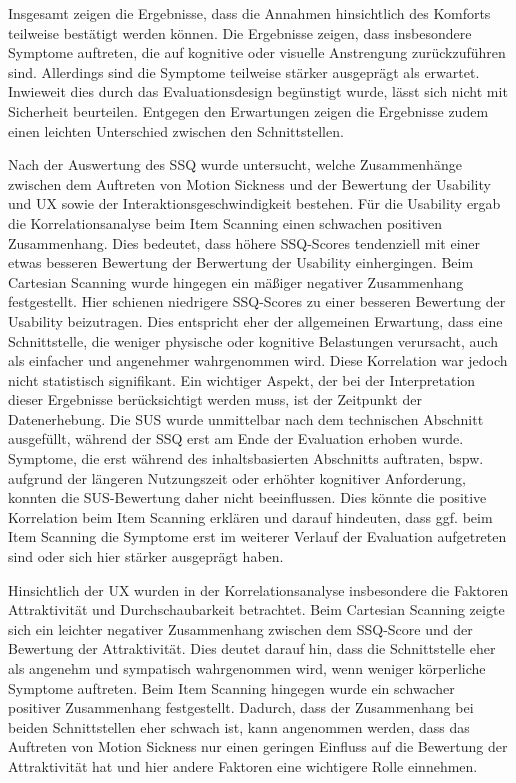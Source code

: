 Insgesamt zeigen die Ergebnisse, dass die Annahmen hinsichtlich des Komforts teilweise bestätigt werden können. Die Ergebnisse zeigen, dass insbesondere Symptome auftreten, die auf kognitive oder visuelle Anstrengung zurückzuführen sind. Allerdings sind die Symptome teilweise stärker ausgeprägt als erwartet. Inwieweit dies durch das Evaluationsdesign begünstigt wurde, lässt sich nicht mit Sicherheit beurteilen. Entgegen den Erwartungen zeigen die Ergebnisse zudem einen leichten Unterschied zwischen den Schnittstellen. 

Nach der Auswertung des SSQ wurde untersucht, welche Zusammenhänge zwischen dem Auftreten von Motion Sickness und der Bewertung der Usability und UX sowie der Interaktionsgeschwindigkeit bestehen.
Für die Usability ergab die Korrelationsanalyse beim Item Scanning einen schwachen positiven Zusammenhang. Dies bedeutet, dass höhere SSQ-Scores tendenziell mit einer etwas besseren Bewertung der Berwertung der Usability einhergingen. Beim Cartesian Scanning wurde hingegen ein mäßiger negativer Zusammenhang festgestellt. Hier schienen niedrigere SSQ-Scores zu einer besseren Bewertung der Usability beizutragen. Dies entspricht eher der allgemeinen Erwartung, dass eine Schnittstelle, die weniger physische oder kognitive Belastungen verursacht, auch als einfacher und angenehmer wahrgenommen wird. Diese Korrelation war jedoch nicht statistisch signifikant. Ein wichtiger Aspekt, der bei der Interpretation dieser Ergebnisse berücksichtigt werden muss, ist der Zeitpunkt der Datenerhebung. Die SUS wurde unmittelbar nach dem technischen Abschnitt ausgefüllt, während der SSQ erst am Ende der Evaluation erhoben wurde. Symptome, die erst während des inhaltsbasierten Abschnitts auftraten, bspw. aufgrund der längeren Nutzungszeit oder erhöhter kognitiver Anforderung, konnten die SUS-Bewertung daher nicht beeinflussen. Dies könnte die positive Korrelation beim Item Scanning erklären und darauf hindeuten, dass ggf. beim Item Scanning die Symptome erst im weiterer Verlauf der Evaluation aufgetreten sind oder sich hier stärker ausgeprägt haben.

Hinsichtlich der UX wurden in der Korrelationsanalyse insbesondere die Faktoren Attraktivität und Durchschaubarkeit betrachtet. 
Beim Cartesian Scanning zeigte sich ein leichter negativer Zusammenhang zwischen dem SSQ-Score und der Bewertung der Attraktivität. Dies deutet darauf hin, dass die Schnittstelle eher als angenehm und sympatisch wahrgenommen wird, wenn weniger körperliche Symptome auftreten. Beim Item Scanning hingegen wurde ein schwacher positiver Zusammenhang festgestellt. Dadurch, dass der Zusammenhang bei beiden Schnittstellen eher schwach ist, kann angenommen werden, dass das Auftreten von Motion Sickness nur einen geringen Einfluss auf die Bewertung der Attraktivität hat und hier andere Faktoren eine wichtigere Rolle einnehmen. 

